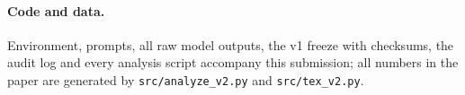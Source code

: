 \documentclass[10pt]{article}
\begin{document}
\paragraph{Code and data.} Environment, prompts, all raw model outputs, the v1 freeze with checksums, the audit log and every analysis script accompany this submission; all numbers in the paper are generated by \texttt{src/analyze\_v2.py} and \texttt{src/tex\_v2.py}.






\end{document}
